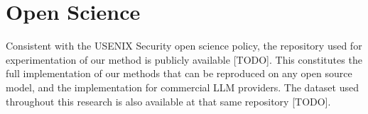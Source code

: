\section*{Open Science}

Consistent with the USENIX Security open science policy, the repository used for experimentation
of our method is publicly available [TODO]. This constitutes the full implementation of our methods that can be reproduced on
any open source model, and the implementation for commercial LLM providers. The dataset used throughout this research
is also available at that same repository [TODO].








